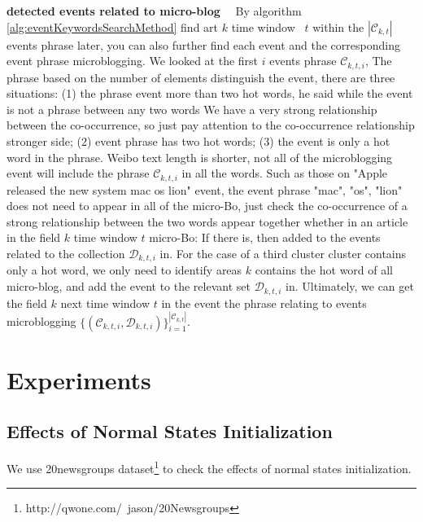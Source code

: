 \documentclass[conference,compsoc]{IEEEtran}
\begin{document}
\textbf{detected events related to micro-blog}
\ \
By algorithm \ref{alg:eventKeywordsSearchMethod} find art \(k \) time window \ \(t \) within the \(| \mathcal{C}_{k, t} | \) events phrase later, you can also further find each event and the corresponding event phrase microblogging.
We looked at the first \(i \) events phrase \(\mathcal{C}_{k, t, i} \),
The phrase based on the number of elements distinguish the event, there are three situations: (1) the phrase event more than two hot words, he said while the event is not a phrase between any two words We have a very strong relationship between the co-occurrence, so just pay attention to the co-occurrence relationship stronger side; (2) event phrase has two hot words; (3) the event is only a hot word in the phrase.
Weibo text length is shorter, not all of the microblogging event will include the phrase \(\mathcal{C}_{k, t, i} \) in all the words.
Such as those on "Apple released the new system mac os lion" event, the event phrase "mac", "os", "lion" does not need to appear in all of the micro-Bo, just check the co-occurrence of a strong relationship between the two words appear together whether in an article in the field \(k \) time window \(t \) micro-Bo: If there is, then added to the events related to the collection \(\mathcal{D}_{k, t, i} \) in.
For the case of a third cluster cluster contains only a hot word, we only need to identify areas \(k \) contains the hot word of all micro-blog, and add the event to the relevant set \(\mathcal{D}_{k, t, i} \) in.
Ultimately, we can get the field \(k \) next time window \(t \) in the event the phrase relating to events microblogging \(\{(\mathcal{C}_{k, t, i}, \mathcal{D}_{k, t, i}) \}_{i=1}^{| \mathcal{C}_{k, t} |} \).

\section{Experiments}
\subsection{Effects of Normal States Initialization}
We use 20newsgroups\cite{lang1995newsweeder} dataset\footnote{http://qwone.com/~jason/20Newsgroups} to check the effects of normal states initialization.
\end{document}
